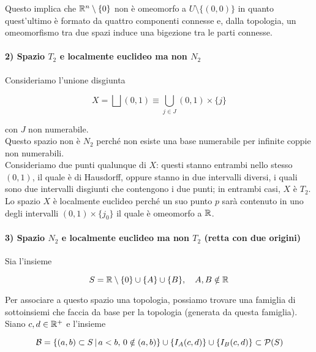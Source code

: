Questo implica che $ \mathbb{R}^{n} \setminus \{0\} $ non è omeomorfo a $ U \setminus \{(0,0)\} $ in quanto quest'ultimo è formato da quattro componenti connesse e, dalla topologia, un omeomorfismo tra due spazi induce una bigezione tra le parti connesse.

\paragraph{2) Spazio $ T_{2} $ e localmente euclideo ma non $ N_{2} $}

Consideriamo l'unione disgiunta

\begin{equation}
	X = \bigsqcup (0,1) \equiv \bigcup_{j \in J} (0,1) \times \{j\}
\end{equation}

con $ J $ non numerabile. \\
Questo spazio non è $ N_{2} $ perché non esiste una base numerabile per infinite coppie non numerabili. \\
Consideriamo due punti qualunque di $ X $: questi stanno entrambi nello stesso $ (0,1) $, il quale è di Hausdorff, oppure stanno in due intervalli diversi, i quali sono due intervalli disgiunti che contengono i due punti; in entrambi casi, $ X $ è $ T_{2} $. \\
Lo spazio $ X $ è localmente euclideo perché un suo punto $ p $ sarà contenuto in uno degli intervalli $ (0,1) \times \{j_{0}\} $ il quale è omeomorfo a $ \mathbb{R} $.

\paragraph{3) Spazio $ N_{2} $ e localmente euclideo ma non $ T_{2} $ (retta con due origini)}

Sia l'insieme

\begin{equation}
	S = \R \setminus \{0\} \cup \{A\} \cup \{B\} \qcomma A,B \notin \R
\end{equation}

Per associare a questo spazio una topologia, possiamo trovare una famiglia di sottoinsiemi che faccia da base per la topologia (generata da questa famiglia). Siano $ c,d \in \mathbb{R}^{+} $ e l'insieme

\begin{equation}
	\mathcal{B} = \left\{ (a,b) \subset S \, \middle| \, a<b, \, 0 \notin (a,b) \right\} \cup \left\{ I_{A}(c,d) \right\} \cup \left\{ I_{B}(c,d) \right\} \subset \mathcal{P}(S)
\end{equation}

